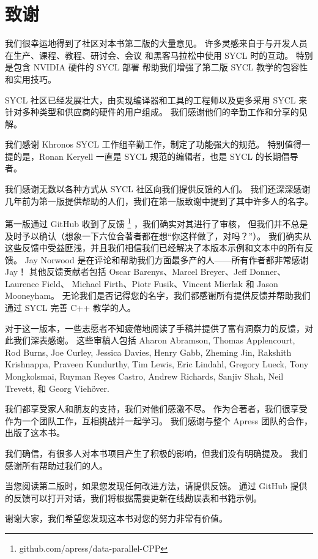 \section*{致谢}
我们很幸运地得到了社区对本书第二版的大量意见。 许多灵感来自于与开发人员在生产、课程、教程、研讨会、会议
和黑客马拉松中使用 SYCL 时的互动。 特别是包含 NVIDIA 硬件的 SYCL 部署
帮助我们增强了第二版 SYCL 教学的包容性和实用技巧。

SYCL 社区已经发展壮大，由实现编译器和工具的工程师以及更多采用 SYCL 来针对多种类型和供应商的硬件的用户组成。 
我们感谢他们的辛勤工作和分享的见解。

我们感谢 Khronos SYCL 工作组辛勤工作，制定了功能强大的规范。 
特别值得一提的是，Ronan Keryell 一直是 SYCL 规范的编辑者，也是 SYCL 的长期倡导者。

我们感谢无数以各种方式从 SYCL 社区向我们提供反馈的人们。 
我们还深深感谢几年前为第一版提供帮助的人们，我们在第一版致谢中提到了其中许多人的名字。

第一版通过 GitHub 收到了反馈 \footnote{github.com/apress/data-parallel-CPP} ，我们确实对其进行了审核，
但我们并不总是及时予以确认（想象一下六位合著者都在想“你这样做了，对吗？”）。 
我们确实从这些反馈中受益匪浅，并且我们相信我们已经解决了本版本示例和文本中的所有反馈。 
Jay Norwood 是在评论和帮助我们方面最多产的人——所有作者都非常感谢 Jay！ 
其他反馈贡献者包括 Oscar Barenys、Marcel Breyer、Jeff Donner、Laurence Field、
Michael Firth、Piotr Fusik、Vincent Mierlak 和 Jason Mooneyham。 
无论我们是否记得您的名字，我们都感谢所有提供反馈并帮助我们通过 SYCL 完善 C++ 教学的人。


对于这一版本，一些志愿者不知疲倦地阅读了手稿并提供了富有洞察力的反馈，对此我们深表感谢。 
这些审稿人包括 Aharon Abramson, Thomas Applencourt, Rod Burns, Joe Curley, 
Jessica Davies, Henry Gabb, Zheming Jin, Rakshith Krishnappa, Praveen Kundurthy, 
Tim Lewis, Eric Lindahl, Gregory Lueck, Tony Mongkolsmai, Ruyman Reyes Castro, 
Andrew Richards, Sanjiv Shah, Neil Trevett, 和 Georg Viehöver.

我们都享受家人和朋友的支持，我们对他们感激不尽。 作为合著者，我们很享受作为一个团队工作，互相挑战并一起学习。 
我们感谢与整个 Apress 团队的合作，出版了这本书。

我们确信，有很多人对本书项目产生了积极的影响，但我们没有明确提及。 我们感谢所有帮助过我们的人。

当您阅读第二版时，如果您发现任何改进方法，请提供反馈。 
通过 GitHub 提供的反馈可以打开对话，我们将根据需要更新在线勘误表和书籍示例。

谢谢大家，我们希望您发现这本书对您的努力非常有价值。
